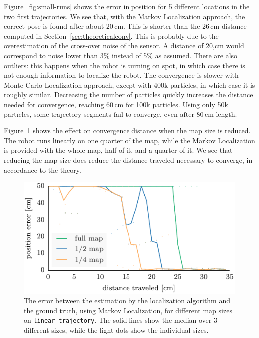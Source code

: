 \documentclass[letterpaper, 10pt, conference]{ieeeconf}
\newcommand{\Fig}[1]{Figure~\ref{fig:#1}}
\newcommand{\sect}[1]{Section~\ref{sec:#1}}
\begin{document}
\Fig{small-runs} shows the error in position for 5 different locations in the two first trajectories.
We see that, with the Markov Localization approach, the correct pose is found after about 20\,cm.
This is shorter than the 26\,cm distance computed in \sect{theoreticalconv}.
This is probably due to the overestimation of the cross-over noise of the sensor.
A distance of 20,cm would correspond to noise lower than 3\% instead of 5\% as assumed.
There are also outliers: this happens when the robot is turning on spot, in which case there is not enough information to localize the robot.
The convergence is slower with Monte Carlo Localization approach, except with 400k particles, in which case it is roughly similar.
Decreasing the number of particles quickly increases the distance needed for convergence, reaching 60\,cm for 100k particles.
Using only 50k particles, some trajectory segments fail to converge, even after 80\,cm length.

\Fig{small-maps} shows the effect on convergence distance when the map size is reduced.
The robot runs linearly on one quarter of the map, while the Markov Localization is provided with the whole map, half of it, and a quarter of it.
We see that reducing the map size does reduce the distance traveled necessary to converge, in accordance to the theory.

\begin{figure}
\includegraphics{ml-small_maps-xy}
\caption{The error between the estimation by the localization algorithm and the ground truth, using Markov Localization, for different map sizes on \texttt{linear trajectory}.
The solid lines show the median over 3 different sizes, while the light dots show the individual sizes.}
\label{fig:small-maps}
\end{figure}
\end{document}
